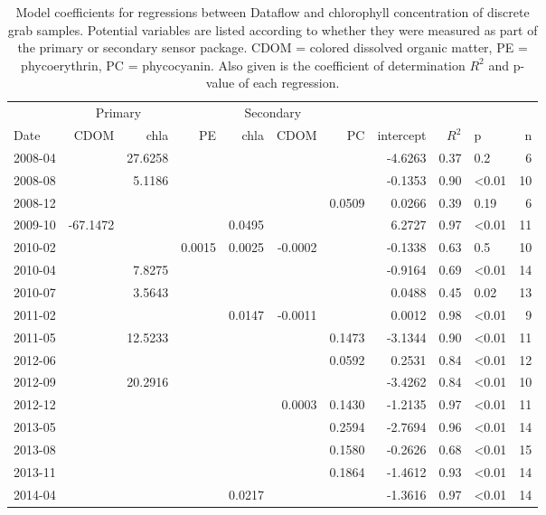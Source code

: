 \begin{table}

\caption{\label{tab:}Model coefficients for regressions between Dataflow and chlorophyll concentration of discrete grab samples. Potential variables are listed according to whether they were measured as part of the primary or secondary sensor package. CDOM = colored dissolved organic matter, PE = phycoerythrin, PC = phycocyanin. Also given is the coefficient of determination $R^2$ and p-value of each regression.}
\centering
\begin{tabular}[t]{lrrrrrrrrlr}
\hline
\multicolumn{1}{c}{ } & \multicolumn{2}{c}{Primary} & \multicolumn{4}{c}{Secondary} \\ \cline{2-3} \cline{4-7}
Date & CDOM & chla & PE & chla & CDOM & PC & intercept & $R^2$ & p & n\\
\hline
2008-04 &  & 27.6258 &  &  &  &  & -4.6263 & 0.37 & 0.2 & 6\\
2008-08 &  & 5.1186 &  &  &  &  & -0.1353 & 0.90 & \textless0.01 & 10\\
2008-12 &  &  &  &  &  & 0.0509 & 0.0266 & 0.39 & 0.19 & 6\\
2009-10 & -67.1472 &  &  & 0.0495 &  &  & 6.2727 & 0.97 & \textless0.01 & 11\\
2010-02 &  &  & 0.0015 & 0.0025 & -0.0002 &  & -0.1338 & 0.63 & 0.5 & 10\\
2010-04 &  & 7.8275 &  &  &  &  & -0.9164 & 0.69 & \textless0.01 & 14\\
2010-07 &  & 3.5643 &  &  &  &  & 0.0488 & 0.45 & 0.02 & 13\\
2011-02 &  &  &  & 0.0147 & -0.0011 &  & 0.0012 & 0.98 & \textless0.01 & 9\\
2011-05 &  & 12.5233 &  &  &  & 0.1473 & -3.1344 & 0.90 & \textless0.01 & 11\\
2012-06 &  &  &  &  &  & 0.0592 & 0.2531 & 0.84 & \textless0.01 & 12\\
2012-09 &  & 20.2916 &  &  &  &  & -3.4262 & 0.84 & \textless0.01 & 10\\
2012-12 &  &  &  &  & 0.0003 & 0.1430 & -1.2135 & 0.97 & \textless0.01 & 11\\
2013-05 &  &  &  &  &  & 0.2594 & -2.7694 & 0.96 & \textless0.01 & 14\\
2013-08 &  &  &  &  &  & 0.1580 & -0.2626 & 0.68 & \textless0.01 & 15\\
2013-11 &  &  &  &  &  & 0.1864 & -1.4612 & 0.93 & \textless0.01 & 14\\
2014-04 &  &  &  & 0.0217 &  &  & -1.3616 & 0.97 & \textless0.01 & 14\\

\end{tabular}
\end{table}
